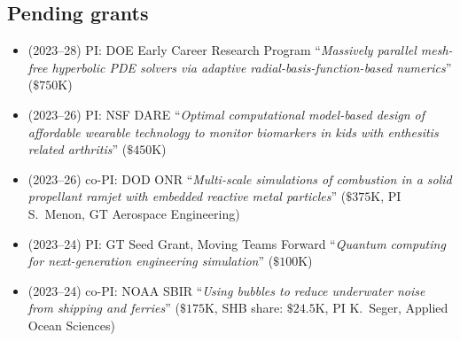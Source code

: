 \subsection{Pending grants}

\begin{itemize}
    \item (2023--28) PI: DOE Early Career Research Program ``\textit{Massively parallel mesh-free hyperbolic PDE solvers via adaptive radial-basis-function-based numerics}'' ($\$750$K)
    \item (2023--26) PI: NSF DARE ``\textit{Optimal computational model-based design of affordable wearable technology to monitor biomarkers in kids with enthesitis related arthritis}'' ($\$450$K)
    \item (2023--26) co-PI: DOD ONR ``\textit{Multi-scale simulations of combustion in a solid propellant ramjet with embedded reactive metal particles}'' ($\$375$K, PI S.\ Menon, GT Aerospace Engineering)
    \item (2023--24) PI: GT Seed Grant, Moving Teams Forward ``\textit{Quantum computing for next-generation engineering simulation}'' ($\$100$K)
    \item (2023--24) co-PI: NOAA SBIR ``\textit{Using bubbles to reduce underwater noise from shipping and ferries}'' ($\$175$K, SHB share: $\$24.5$K, PI K.\ Seger, Applied Ocean Sciences)
\end{itemize}
